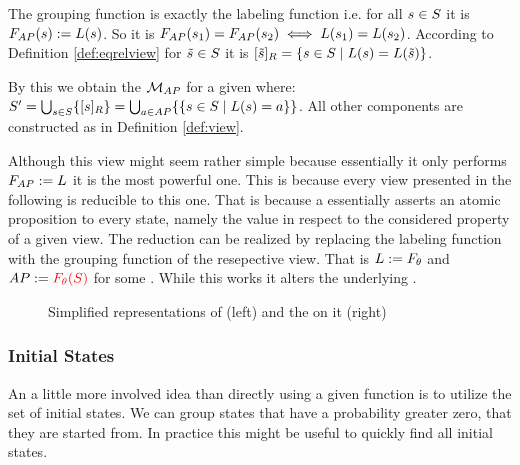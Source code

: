 \documentclass[preview]{standalone}
\begin{document}
The grouping function is exactly the labeling function i.e. for all ${s} \in {S}$ it is ${{F_{{AP}}}}({s}) := {L}({s})$. So it is ${{F_{{AP}}}}({s}_1) = {{F_{{AP}}}}({s}_2) \iff {L}({s}_1) = {L}({s}_2)$. According to Definition \ref{def:eqrelview} for ${\tilde{{s}}} \in {S}$ it is ${{[{\tilde{{s}}}]_{{R}}}} = \{{s} \in {S} \mid {L}({s}) = {L}({\tilde{{s}}})\}$.

By this we obtain the \viewN ${{{{{\mathcal{M}}}}_{{AP}}}}$ for a given \chgphN \chgph where: ${S}' = \bigcup_{{s} \in {S}} \{{{[{s}]_{{R}}}}\} =  \bigcup_{a \in {AP}} \{\{{s} \in {S} \mid {L}({s}) = a\}\}$. All other components are constructed as in Definition \ref{def:view}.

Although this view might seem rather simple because essentially it only performs ${{F_{{AP}}}} := {L}$ it is the most powerful one. This is because every view presented in the following is reducible to this one. That is because a \grpfctN essentially asserts an atomic proposition to every state, namely the value in respect to the considered property of a given view. The reduction can be realized by replacing the labeling function with the grouping function of the resepective view. That is ${L} := {F_{{\theta}}}$ and ${AP} := {\color{red}{F_{\ensuremath{{\theta}}}}({S})}$ for some \grpfctN \grpfct. While this works it alters the underlying \chgphN.

\begin{figure}[h]
	\begin{minipage}{.6\textwidth}
		
	\end{minipage}%
	\begin{minipage}{.5\textwidth}
	
	\end{minipage}
	\caption{Simplified representations of \mdp (left) and the \viewN \viewatomicprops on it (right)}
	\label{fig:apIdentBeforeAfter}  
\end{figure}


\subsubsection{Initial States}
An a little more involved idea than directly using a given function is to utilize the set of initial states. We can group states that have a probability greater zero, that they are started from. In practice this might be useful to quickly find all initial states.
\end{document}
